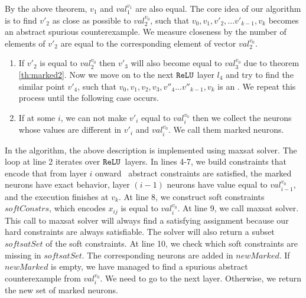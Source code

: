 By the above theorem, ${v_1}$ and ${val_1^{v_1}}$ are also equal. 
The core idea of our algorithm is to find ${v'_2}$ as close as possible to ${val_2^{v_0}}$, 
such that ${v_0}, {v_1}, {v'_2}, ... {v'_{k-1}}, {v_k}$ becomes an abstract spurious counterexample. 
We measure closeness by the number of elements of ${v'_2}$ are equal to the 
corresponding element of vector ${val_2^{v_0}}$.
\begin{enumerate}
\item If ${v'_2}$ is equal to ${val_2^{v_0}}$ then ${v'_3}$ will also become 
  equal to ${val_3^{v_0}}$ due to theorem \ref{th:marked2}. 
  Now we move on to the next $\mathtt{ReLU}${} layer $l_4$ and try to find the similar point ${v'_4}$, such that 
  ${v_0}, {v_1}, {v_2}, {v_3},{v''_4}... {v''_{k-1}},{v_k}$ is an . 
  We repeat this process until the following case occurs. 
\item If at some $i$, we can not make ${v'_i}$ equal to ${val_i^{v_0}}$ then we collect the neurons
  whose values are different in ${v'_i}$ and ${val_i^{v_0}}$. We call them marked neurons.
\end{enumerate}

In the algorithm, the above description is implemented using maxsat solver.
The loop at line 2 iterates over $\mathtt{ReLU}${}~layers.
In lines 4-7, we build constraints that encode that from layer $i$ onward
\deeppoly~abstract constraints are satisfied,
the marked neurons have exact behavior, layer $(i-1)$ neurons have value equal to
${val_{i-1}^{v_0}}$, and the execution finishes at $v_k$.
At line 8, we construct soft constraints $softConstrs$, which encodes $x_{ij}$ is equal to $val_{i}^{v_0}$.
At line 9, we call maxsat solver. 
This call to maxsat solver will always find a satisfying assignment because
our hard constraints are always satisfiable.
The solver will also return a subset $softsatSet$ of the soft constraints.
At line 10, we check which soft constraints are missing in $softsatSet$.
The corresponding neurons are added in $newMarked$.
If $newMarked$ is empty, we have managed to find a spurious
abstract counterexample from $val^{v_0}_{i}$.
We need to go to the next layer.
Otherwise, we return the new set of marked neurons.




















